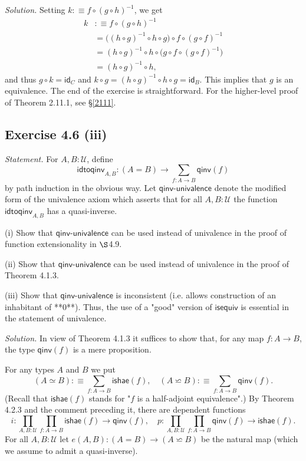 \documentclass[12pt]{article}
\newcommand{\de}{:\equiv}
\newcommand{\id}{\mathsf{id}}
\newcommand{\nn}{\noindent}
\begin{document}
\nn\emph{Solution.} Setting $k\de f\circ (g\circ h)^{-1}$, we get 
\begin{align*}
k&\de f\circ (g\circ h)^{-1}\\
&=\big((h\circ g)^{-1}\circ h\circ g\big)\circ f\circ (g\circ f)^{-1}\\
&=(h\circ g)^{-1}\circ h\circ\big(g\circ f\circ (g\circ f)^{-1}\big)\\
&=(h\circ g)^{-1}\circ h,
\end{align*}
and thus $g\circ k=\id_C$ and $k\circ g=(h\circ g)^{-1}\circ h\circ g=\id_B$. This implies that $g$ is an equivalence. The end of the exercise is straightforward. For the higher-level proof of Theorem 2.11.1, see \S\ref{2111}.


\subsection{Exercise 4.6 (iii)}

\emph{Statement.} For $A,B:\mathcal U$, define
$$
\mathsf{idtoqinv}_{A,B}:(A=B)\to\sum_{f:A\to B}\mathsf{qinv}(f)
$$
by path induction in the obvious way. Let $\mathsf{qinv}$-$\mathsf{univalence}$ denote the modified form of the univalence axiom which asserts that for all $A,B:\mathcal U$ the function $\mathsf{idtoqinv}_{A,B}$ has a quasi-inverse.

\nn(i) Show that $\mathsf{qinv}$-$\mathsf{univalence}$ can be used instead of univalence in the proof of function extensionality in $\S$4.9.

\nn(ii) Show that $\mathsf{qinv}$-$\mathsf{univalence}$ can be used instead of univalence in the proof of Theorem 4.1.3.

\nn(iii) Show that $\mathsf{qinv}$-$\mathsf{univalence}$ is inconsistent (i.e. allows construction of an inhabitant of **0**). Thus, the use of a "good" version of $\mathsf{isequiv}$ is essential in the statement of univalence.

\nn\emph{Solution.} In view of Theorem 4.1.3 it suffices to show that, for any map $f:A\to B$, the type $\mathsf{qinv}(f)$ is a mere proposition. 

For any types $A$ and $B$ we put 
$$
(A\simeq B):\equiv\sum_{f:A\to B}\mathsf{ishae}(f),\quad(A\backsimeq B):\equiv\sum_{f:A\to B}\mathsf{qinv}(f).
$$ 
(Recall that $\mathsf{ishae}(f)$ stands for "$f$ is a half-adjoint equivalence".) By Theorem 4.2.3 and the comment preceding it, there are dependent functions 
$$
i:\prod_{A,B:\mathcal U}\prod_{f:A\to B}\mathsf{ishae}(f)\to\mathsf{qinv}(f),\quad p:\prod_{A,B:\mathcal U}\prod_{f:A\to B}\mathsf{qinv}(f)\to\mathsf{ishae}(f).
$$ 
For all $A,B:\mathcal U$ let $e(A,B):(A=B)\to(A\backsimeq B)$ be the natural map (which we assume to admit a quasi-inverse).
\end{document}
